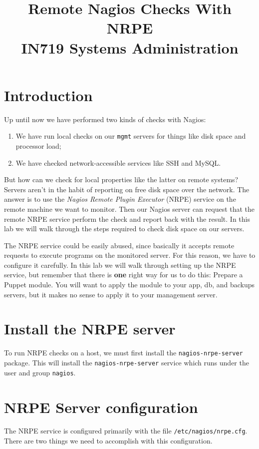 \documentclass{article}   	%
\title{Remote Nagios Checks With NRPE\\ IN719 Systems Administration}
\date{}							%
\begin{document}
\maketitle

\section*{Introduction}
Up until now we have performed two kinds of checks with Nagios:

\begin{enumerate}
  \item We have run local checks on our \texttt{mgmt} servers for things like disk space and processor load;
  \item We have checked network-accessible services like SSH and MySQL.
\end{enumerate}

But how can we check for local properties like the latter on remote systems?  Servers aren't in the habit of reporting on free disk space over the network.  The answer is to use the \emph{Nagios Remote Plugin Executor} (NRPE) service on the remote machine we want to monitor.  Then our Nagios server can request that the remote NRPE service perform the check and report back with the result.  In this lab we will walk through the steps required to check disk space on our servers.

The NRPE service could be easily abused, since basically it accepts remote requests to execute programs on the monitored server.  For this reason, we have to configure it carefully. In this lab we will walk through setting up the NRPE service, but remember that there is \textbf{one} right way for us to do this: Prepare a Puppet module. You will want to apply the module to your app, db, and backups servers, but it makes no sense to apply it to your management server.

\section{Install the NRPE server} 
To run NRPE checks on a host, we must first install the \texttt{nagios-nrpe-server} package. This will install the \texttt{nagios-nrpe-server} service which runs under the user and group \texttt{nagios}.

\section{NRPE Server configuration}
The NRPE service is configured primarily with the file \texttt{/etc/nagios/nrpe.cfg}. There are two things we need to accomplish with this configuration.
\end{document}
